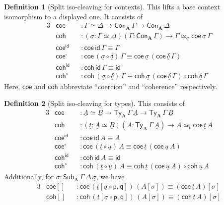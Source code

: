 \documentclass[12pt,a4paper,twoside,openany]{book}
\theoremstyle{remark}
\theoremstyle{definition}
\newtheorem{mydefinition}{Definition}
\theoremstyle{theorem}
\newcommand{\bs}[1]{\boldsymbol{#1}}
\newcommand{\id}{\mathsf{id}}
\newcommand{\Con}{\mathsf{Con}}
\newcommand{\Sub}{\mathsf{Sub}}
\newcommand{\Ty}{\mathsf{Ty}}
\newcommand{\ra}{\rightarrow}
\newcommand{\p}{\mathsf{p}}
\newcommand{\q}{\mathsf{q}}
\newcommand{\bA}{\bs{A}}
\newcommand{\ul}[1]{\underline{#1}}
\newcommand{\ulGamma}{\ul{\Gamma}}
\newcommand{\ulDelta}{\ul{\Delta}}
\newcommand{\uldelta}{\ul{\delta}}
\newcommand{\ulsigma}{\ul{\sigma}}
\newcommand{\ult}{\ul{t}}
\newcommand{\ulu}{\ul{u}}
\newcommand{\ulA}{\ul{A}}
\newcommand{\ulB}{\ul{B}}
\newcommand{\coe}{\mathsf{coe}}
\newcommand{\coh}{\mathsf{coh}}
\begin{document}
\begin{mydefinition}[Split iso-cleaving for contexts] This lifts a base context isomorphism to a displayed one. It consists of
\begingroup
\allowdisplaybreaks
\begin{alignat*}{3}
  & \coe &&: \ulGamma \simeq \ulDelta \ra \Con_{\bA}\,\ulGamma \ra \Con_{\bA}\,\ulDelta\\
  & \coh &&: (\ulsigma : \ulGamma \simeq \ulDelta)(\Gamma : \Con_{\bA}\,\ulGamma)
           \ra \Gamma \simeq_{\ulsigma} \coe\,\ulsigma\,\Gamma\\
  & \coe^{\id} && : \coe\,\id\,\Gamma \equiv \Gamma\\
  & \coe^{\circ} && : \coe\,(\ulsigma\circ\uldelta)\,\Gamma \equiv \coe\,\ulsigma\,(\coe\,\uldelta\,\Gamma)\\
  & \coh^{\id} && : \coh\,\id\,\Gamma \equiv \id\\
  & \coh^{\circ} && : \coh\,(\ulsigma\circ\uldelta)\,\Gamma \equiv \coh\,\ulsigma\,(\coe\,\uldelta\,\Gamma)
          \circ \coh\,\uldelta\,\Gamma
\end{alignat*}
\endgroup
Here, $\coe$ and $\coh$ abbreviate ``coercion'' and ``coherence'' respectively.
\end{mydefinition}

\begin{mydefinition}[Split iso-cleaving for types] This consists of
\begingroup
\allowdisplaybreaks
\begin{alignat*}{3}
  & \coe &&: \ulA \simeq \ulB \ra \Ty_{\bA}\,\Gamma\,\ulA \ra \Ty_{\bA}\,\Gamma\,\ulB\\
  & \coh &&: (\ult : \ulA \simeq \ulB)(A : \Ty_{\bA}\,\Gamma\,\ulA)
           \ra A \simeq_{\ult} \coe\,\ult\,A\\
  & \coe^{\id} && : \coe\,\id\,A \equiv A\\
  & \coe^{\circ} && : \coe\,(\ult\circ\ulu)\,A \equiv \coe\,\ult\,(\coe\,\ulu\,A)\\
  & \coh^{\id} &&: \coh\,\id\,A \equiv \id\\
  & \coh^{\circ} &&: \coh\,(\ult\circ\ulu)\,A \equiv \coh\,\ult\,(\coe\,\ulu\,A)
          \circ \coh\,\ulu\,A
\end{alignat*}
\endgroup
Additionally, for $\sigma : \Sub_{\bA}\,\Gamma\,\Delta\,\ulsigma$, we have
\begin{alignat*}{3}
  & \coe[] &&: \coe\,(\ult[\ulsigma\circ \p,\q])\,(A[\sigma]) \equiv (\coe\,\ult\,A)[\sigma]\\
  & \coh[] &&: \coh\,(\ult[\ulsigma\circ \p,\q])\,(A[\sigma]) \equiv (\coh\,\ult\,A)[\sigma]
\end{alignat*}

\end{mydefinition}
\end{document}
